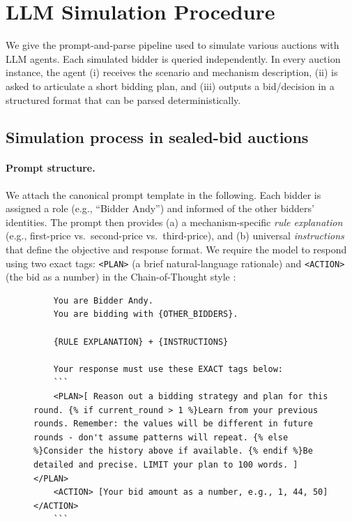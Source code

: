 \section{LLM Simulation Procedure}

We give the prompt-and-parse pipeline used to simulate various auctions with LLM agents. Each simulated bidder is queried independently. In every auction instance, the agent (i) receives the scenario and mechanism description, (ii) is asked to articulate a short bidding plan, and (iii) outputs a bid/decision in a structured format that can be parsed deterministically.


\subsection{Simulation process in sealed-bid auctions}\label{app:process}

\paragraph{Prompt structure.}
We attach the canonical prompt template in the following. Each bidder is assigned a role (e.g., ``Bidder Andy'') and informed of the other bidders' identities. The prompt then provides (a) a mechanism-specific \emph{rule explanation} (e.g., first-price vs.\ second-price vs.\ third-price), and (b) universal \emph{instructions} that define the objective and response format. We require the model to respond using two exact tags: \verb|<PLAN>| (a brief natural-language rationale) and \verb|<ACTION>| (the bid as a number) in the Chain-of-Thought style \citet{wei2022chain}:


\begin{figure}[H]
\centering
\begin{minipage}{0.95\textwidth}
\begin{lstlisting}
    You are Bidder Andy.            
    You are bidding with {OTHER_BIDDERS}.     
    
    {RULE EXPLANATION} + {INSTRUCTIONS}

    Your response must use these EXACT tags below:
    ```
    <PLAN>[ Reason out a bidding strategy and plan for this round. {% if current_round > 1 %}Learn from your previous rounds. Remember: the values will be different in future rounds - don't assume patterns will repeat. {% else %}Consider the history above if available. {% endif %}Be detailed and precise. LIMIT your plan to 100 words. ] </PLAN>
    <ACTION> [Your bid amount as a number, e.g., 1, 44, 50] </ACTION>
    ```
\end{lstlisting}
\end{minipage}
\end{figure}


